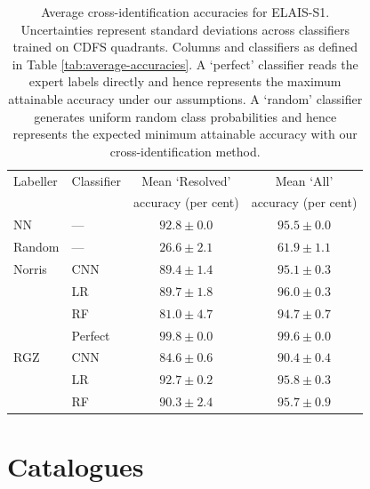 \documentclass[fleqn,usenatbib,usedcolumn]{mnras}
\begin{document}
\begin{table}
  \caption{Average cross-identification accuracies for ELAIS-S1.
    Uncertainties represent standard deviations across classifiers trained
    on CDFS quadrants. Columns and classifiers as defined in Table
    \ref{tab:average-accuracies}.  A `perfect' classifier reads the expert
    labels directly and hence represents the maximum attainable accuracy
    under our assumptions. A `random' classifier generates uniform random
    class probabilities and hence represents the expected minimum attainable
    accuracy with our cross-identification method.}
    \label{tab:cross-id-accuracies-elais}
  \begin{tabular}{llcc}
    \hline
    Labeller & Classifier & Mean `Resolved' & Mean `All'\\
    && accuracy (per cent) & accuracy (per cent)\\
    \hline
    NN & --- & $92.8 \pm 0.0$ & $95.5 \pm 0.0$\\
    Random & --- & $26.6 \pm 2.1$ & $61.9 \pm 1.1$\\
    Norris & CNN & $89.4 \pm 1.4$ & $95.1 \pm 0.3$\\
     & LR & $89.7 \pm 1.8$ & $96.0 \pm 0.3$\\
     & RF & $81.0 \pm 4.7$ & $94.7 \pm 0.7$\\
     & Perfect & $99.8 \pm 0.0$ & $99.6 \pm 0.0$\\
    RGZ & CNN & $84.6 \pm 0.6$ & $90.4 \pm 0.4$\\
     & LR & $92.7 \pm 0.2$ & $95.8 \pm 0.3$\\
     & RF & $90.3 \pm 2.4$ & $95.7 \pm 0.9$\\
    \hline
  \end{tabular}
\end{table}


\section{Catalogues}
\end{document}
